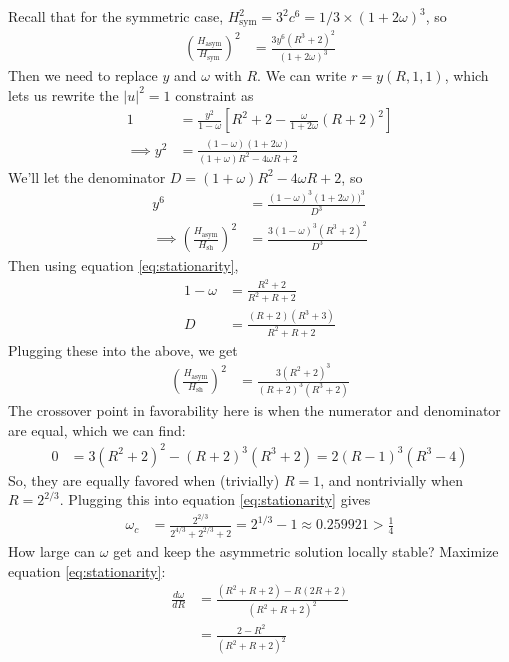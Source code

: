\documentclass[11pt, reqno]{amsart}
\theoremstyle{notestyle}
\theoremstyle{defstyle}
\begin{document}
Recall that for the symmetric case, $H_\text{sym}^2 = 3^2c^6 = 1/3 \times (1+2\omega)^3$, so
\begin{align*}
    \left( \frac{H_\text{asym}}{H_\text{sym}} \right)^2
    &= \frac{3y^6(R^3+2)^2}{(1+2\omega)^3}
\end{align*}
Then we need to replace $y$ and $\omega$ with $R$.
We can write $r = y(R, 1, 1)$, which lets us rewrite the $|u|^2 = 1$ constraint as
\begin{align*}
    1 &= \frac{y^2}{1-\omega} \left[ R^2 + 2 - \frac{\omega}{1+2\omega} (R+2)^2 \right] \\
    \implies y^2
    &= \frac{(1-\omega)(1+2\omega)}{(1+\omega)R^2 - 4\omega R +2}
\end{align*}
We'll let the denominator $D = (1+\omega)R^2 - 4\omega R + 2$, so
\begin{align*}
    y^6
    &= \frac{(1-\omega)^3 (1+2\omega))^3}{D^3} \\
    \implies
    \left( \frac{H_\text{asym}}{H_\text{sh}} \right)^2
    &= \frac{3(1-\omega)^3 (R^3+2)^2}{D^3}
\end{align*}
Then using equation \ref{eq:stationarity},
\begin{align*}
    1-\omega
    &= \frac{R^2+2}{R^2+R+2} \\
    D
    &= \frac{(R+2)(R^3+3)}{R^2+R+2}
\end{align*}
Plugging these into the above, we get
\begin{align*}
    \left( \frac{H_\text{asym}}{H_\text{sh}} \right)^2
    &= \frac{3(R^2+2)^3}{(R+2)^3(R^3+2)}
\end{align*}
The crossover point in favorability here is when the numerator and denominator are equal, which we can find:
\begin{align*}
    0
    &= 3(R^2+2)^2 - (R+2)^3(R^3+2)
    = 2(R-1)^3 (R^3-4)
\end{align*}
So, they are equally favored when (trivially) $R=1$, and nontrivially when $R = 2^{2/3}$.
Plugging this into equation \ref{eq:stationarity} gives
\begin{align*}
    \omega_c
    &= \frac{2^{2/3}}{2^{4/3} + 2^{2/3} + 2}
    = 2^{1/3} - 1
    \approx 0.259921 > \frac{1}{4}
\end{align*}
How large can $\omega$ get and keep the asymmetric solution locally stable?
Maximize equation \ref{eq:stationarity}:
\begin{align*}
    \frac{d\omega}{dR}
    &= \frac{(R^2 + R + 2) - R(2R+2)}{(R^2+R+2)^2} \\
    &= \frac{2-R^2}{(R^2+R+2)^2}
\end{align*}
\end{document}
